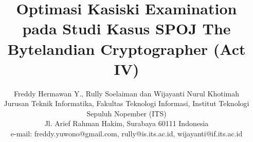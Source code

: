 
\author{Freddy Hermawan Y., Rully Soelaiman dan Wijayanti Nurul Khotimah\\
	Jurusan Teknik Informatika, Fakultas Teknologi Informasi, Institut Teknologi Sepuluh Nopember (ITS)\\
	Jl. Arief Rahman Hakim, Surabaya 60111 Indonesia\\
	e-mail: freddy.yuwono@gmail.com, rully@is.its.ac.id, wijayanti@if.its.ac.id
	}%




\title{Optimasi Kasiski Examination pada Studi Kasus SPOJ The Bytelandian Cryptographer (Act IV)}
\maketitle